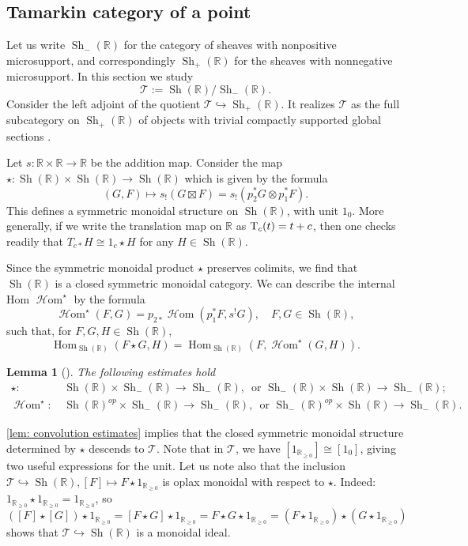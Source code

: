 \documentclass[11pt]{amsart}
\numberwithin{equation}{section}
\theoremstyle{plain}
\newtheorem{Lemma}[lemma]{Lemma}
\theoremstyle{definition}
\theoremstyle{remark}
\newcommand{\bR} { {\mathbb{R}}}
\newcommand{\sT} { {\mathscr{T}}}
\newcommand{\Sh} { {\operatorname{Sh}}}
\newcommand\Hom{\operatorname{Hom}}
\newcommand\sHom{\operatorname{\mathscr{H}om}}
\newcommand\nT{ {\textnormal{T}} }
\begin{document}
\subsection{Tamarkin category of a point}
\label{Tamarkin point}

Let us write $\Sh_-(\bR)$ for the category of sheaves with nonpositive microsupport, and correspondingly $\Sh_+(\bR)$ for the sheaves with nonnegative microsupport.  In this section we study
\[\sT := \Sh(\bR) / \Sh_-(\bR).\]
Consider the left adjoint of the quotient $\sT \hookrightarrow \Sh_+(\bR)$. It realizes $\sT$ as the full subcategory on $\Sh_+(\bR)$ of objects with trivial compactly supported global sections \cite[Proposition 4.2]{Hochschild-Kuo-Shende-Zhang}. 

Let $s: \bR \times \bR \rightarrow \bR$ be the addition map.
Consider the map 
$\star: \Sh(\bR) \times \Sh(\bR) \rightarrow \Sh(\bR)$  which is given by the formula
\[ (G, F) \mapsto s_! (G \boxtimes F) = s_! (p_2^* G \otimes p_1^* F ).\]
This defines a symmetric monoidal structure on $\Sh(\bR)$, with unit $1_{0}$.  More generally, if we write the 
translation map on $\bR$ as $\nT_c(t)=t+c$, then 
one checks readily that $T_{c*} H \cong 1_{c} \star H$ for any $H \in \Sh(\bR)$. 

Since the symmetric monoidal product $\star$ preserves colimits, we find that $\Sh(\bR)$ is a closed symmetric monoidal category. We can describe the internal Hom $\sHom^\star$ by the formula
\[\sHom^\star(F,G)=p_{2*}\sHom(p_1^{*}F,s^!G),\quad F,G\in \Sh(\bR),\]
such that, for $F,G,H\in \Sh(\bR)$, 
\[\Hom_{\Sh(\bR)}(F\star G,H)=\Hom_{\Sh(\bR)}(F,\sHom^\star(G,H)).\]


\begin{Lemma}[{\cite[Corollary 4.14]{GS2014}}] \label{lem: convolution estimates}
The following estimates hold
\begin{align*}
    \star : &\,\Sh(\bR)\times \Sh_-(\bR) \rightarrow \Sh_-(\bR),\, \text{ or } \Sh_-(\bR)\times \Sh(\bR) \rightarrow \Sh_-(\bR);\\
   \sHom^\star : &\,\Sh(\bR)^{op}\times \Sh_-(\bR) \rightarrow \Sh_-(\bR),\, \text{ or } \Sh_-(\bR)^{op}\times \Sh(\bR) \rightarrow \Sh_-(\bR).
\end{align*}
\end{Lemma}




\autoref{lem: convolution estimates} implies that
the closed symmetric monoidal structure determined by $\star$
descends to $\sT$.  Note that in $\sT$, we have 
$[1_{\bR_{\geq 0}}]\cong [1_{0}]$, giving two useful expressions for
the unit.  
Let us note also that the inclusion $\sT \hookrightarrow \Sh(\bR), [F] \mapsto F \star 1_{\bR_{\geq 0}}$ is oplax monoidal with respect to $\star$.  Indeed: $ 1_{\bR_{\geq 0}}\star1_{\bR_{\geq 0}}=1_{\bR_{\geq 0}}$, so
\[([F]\star [G])\star 1_{\bR_{\geq 0}}=[F\star G] \star 1_{\bR_{\geq 0}}= F\star G \star 1_{\bR_{\geq 0}}=(F \star 1_{\bR_{\geq 0}}) \star (G\star 1_{\bR_{\geq 0}})\]
shows that $\sT \hookrightarrow \Sh(\bR)$ is a monoidal ideal.
\end{document}
